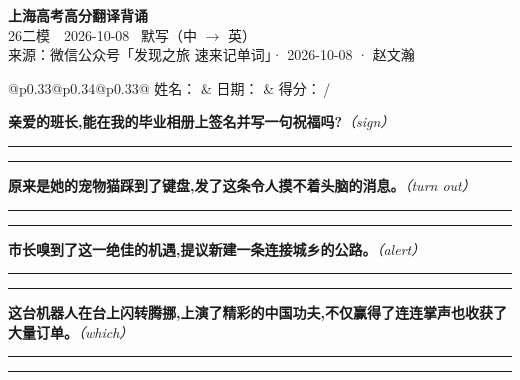 \documentclass[11pt,a4paper]{article}
\newcommand{\num}[1]{\makebox[1.9em][r]{#1.}\hspace{0.3em}}
\newcommand{\wline}{\noindent\rule{\linewidth}{0.4pt}}
\newcommand{\prompt}[1]{\emph{\textcolor{tipblue}{\small（#1）}}}
\begin{document}
\pagestyle{plain}
\begin{center}
{\LARGE\bfseries 上海高考高分翻译背诵 }\\[0.25em]
{\large 26二模　2026-10-08 \quad\ 默写（中 $\to$ 英）}\\[0.35em]
{\footnotesize 来源：微信公众号「发现之旅 速来记单词」· 2026-10-08 · 赵文瀚}
\end{center}

\vspace{0.4em}
\noindent\begin{tabular}{@{}p{0.33\textwidth}@{}p{0.34\textwidth}@{}p{0.33\textwidth}@{}}
姓名：\underline{\hspace{2.0cm}} & 日期：\underline{\hspace{2.0cm}} & 得分：\underline{\hspace{1.4cm}}\,/ \\
\end{tabular}

\vspace{0.5em}

\vspace{0.8em}
\num{1}\textbf{亲爱的班长,能在我的毕业相册上签名并写一句祝福吗?}\prompt{sign}

\vspace{0.3em}

\wline\vspace{0.3em}
\wline

\num{2}\textbf{原来是她的宠物猫踩到了键盘,发了这条令人摸不着头脑的消息。}\prompt{turn out}

\vspace{0.3em}

\wline\vspace{0.3em}
\wline

\num{3}\textbf{市长嗅到了这一绝佳的机遇,提议新建一条连接城乡的公路。}\prompt{alert}

\vspace{0.3em}

\wline\vspace{0.3em}
\wline

\num{4}\textbf{这台机器人在台上闪转腾挪,上演了精彩的中国功夫,不仅赢得了连连掌声也收获了大量订单。}\prompt{which}

\vspace{0.3em}

\wline\vspace{0.3em}
\wline
\end{document}
